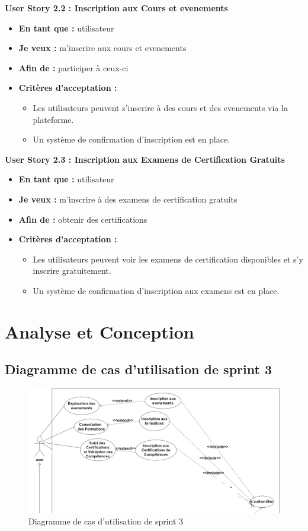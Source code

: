 \documentclass[a4paper, 11pt, openany]{report}
\begin{document}
\textbf{User Story 2.2 : Inscription aux Cours et evenements}
\begin{itemize}
    \item \textbf{En tant que :} utilisateur
    \item \textbf{Je veux :} m'inscrire aux cours et evenements
    \item \textbf{Afin de :} participer à ceux-ci
    \item \textbf{Critères d'acceptation :}
    \begin{itemize}
        \item Les utilisateurs peuvent s'inscrire à des cours et des evenements via la plateforme.
        \item Un système de confirmation d'inscription est en place.
    \end{itemize}
\end{itemize}

\textbf{User Story 2.3 : Inscription aux Examens de Certification Gratuits}
\begin{itemize}
    \item \textbf{En tant que :} utilisateur
    \item \textbf{Je veux :} m'inscrire à des examens de certification gratuits
    \item \textbf{Afin de :} obtenir des certifications
    \item \textbf{Critères d'acceptation :}
    \begin{itemize}
        \item Les utilisateurs peuvent voir les examens de certification disponibles et s'y inscrire gratuitement.
        \item Un système de confirmation d'inscription aux examens est en place.
    \end{itemize}
\end{itemize}


\section{Analyse et Conception}
\subsection{Diagramme de cas d'utilisation de sprint 3}

\begin{figure}[H]
\centering
\includegraphics[width=\textwidth]{sprint3-usecase.png} 
\caption{Diagramme de cas d'utilisation de sprint 3}
\label{fig:s3-use}
\end{figure}
\end{document}
